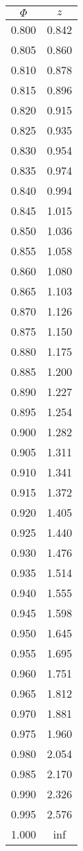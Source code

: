 \begin{tabular}{|c|c|}\hline
$\Phi$ & $z$ \\ \hline
0.800 & 0.842\\
0.805 & 0.860\\
0.810 & 0.878\\
0.815 & 0.896\\
0.820 & 0.915\\
0.825 & 0.935\\
0.830 & 0.954\\
0.835 & 0.974\\
0.840 & 0.994\\
0.845 & 1.015\\
0.850 & 1.036\\
0.855 & 1.058\\
0.860 & 1.080\\
0.865 & 1.103\\
0.870 & 1.126\\
0.875 & 1.150\\
0.880 & 1.175\\
0.885 & 1.200\\
0.890 & 1.227\\
0.895 & 1.254\\
0.900 & 1.282\\
0.905 & 1.311\\
0.910 & 1.341\\
0.915 & 1.372\\
0.920 & 1.405\\
0.925 & 1.440\\
0.930 & 1.476\\
0.935 & 1.514\\
0.940 & 1.555\\
0.945 & 1.598\\
0.950 & 1.645\\
0.955 & 1.695\\
0.960 & 1.751\\
0.965 & 1.812\\
0.970 & 1.881\\
0.975 & 1.960\\
0.980 & 2.054\\
0.985 & 2.170\\
0.990 & 2.326\\
0.995 & 2.576\\
1.000 & inf\\
\hline \end{tabular}

\columnbreak

